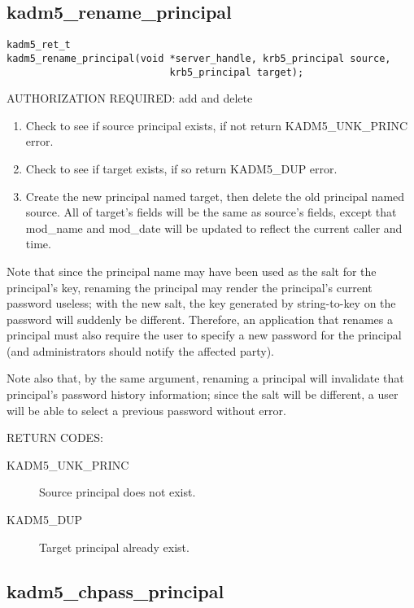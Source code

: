 \subsection{kadm5_rename_principal}

\begin{verbatim}
kadm5_ret_t
kadm5_rename_principal(void *server_handle, krb5_principal source,
                            krb5_principal target);
\end{verbatim}

AUTHORIZATION REQUIRED: add and delete

\begin{enumerate}
\item Check to see if source principal exists, if not return
KADM5_UNK_PRINC error. 
\item Check to see if target exists, if so return KADM5_DUP error.
\item Create the new principal named target, then delete the old
principal named source.  All of target's fields will be the same as
source's fields, except that mod_name and mod_date will be updated to
reflect the current caller and time.
\end{enumerate}

Note that since the principal name may have been used as the salt for
the principal's key, renaming the principal may render the principal's
current password useless; with the new salt, the key generated by
string-to-key on the password will suddenly be different.  Therefore,
an application that renames a principal must also require the user to
specify a new password for the principal (and administrators should
notify the affected party).

Note also that, by the same argument, renaming a principal will
invalidate that principal's password history information; since the
salt will be different, a user will be able to select a previous
password without error.

RETURN CODES: 

\begin{description}
\item[KADM5_UNK_PRINC] Source principal does not exist.
\item[KADM5_DUP] Target principal already exist.
\end{description}

\subsection{kadm5_chpass_principal}

